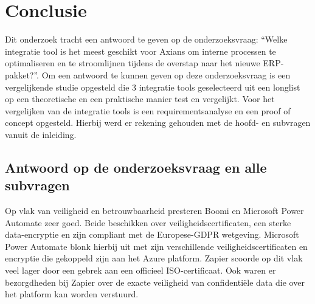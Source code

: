 
\chapter{Conclusie}%
\label{ch:conclusie}


Dit onderzoek tracht een antwoord te geven op de onderzoeksvraag: “Welke integratie tool is het meest geschikt voor Axians om interne processen
te optimaliseren en te stroomlijnen tijdens de overstap naar het nieuwe ERP-
pakket?”. Om een antwoord te kunnen geven op deze onderzoeksvraag is een vergelijkende studie opgesteld die 3 integratie tools geselecteerd uit een longlist op een theoretische en een praktische manier test en vergelijkt. Voor het vergelijken van de integratie tools is een requirementsanalyse en een proof of concept opgesteld. Hierbij werd er rekening gehouden met de hoofd- en subvragen vanuit de inleiding.

\section{Antwoord op de onderzoeksvraag en alle subvragen}%
\label{Antwoord onderzoeksvraag en subvragen}

Op vlak van veiligheid en betrouwbaarheid presteren Boomi en Microsoft Power Automate zeer goed. Beide beschikken over veiligheidscertificaten, een sterke data-encryptie en zijn compliant met de Europese-GDPR wetgeving. Microsoft Power Automate blonk hierbij uit met zijn verschillende veiligheidscertificaten en encryptie die gekoppeld zijn aan het Azure platform. Zapier scoorde op dit vlak veel lager door een gebrek aan een officieel ISO-certificaat. Ook waren er bezorgdheden bij Zapier over de exacte veiligheid van confidentiële data die over het platform kan worden verstuurd.

\vspace{\baselineskip}

